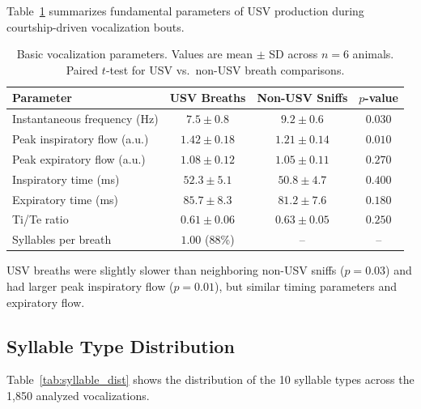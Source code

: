 \documentclass[11pt]{article}
\begin{document}
Table~\ref{tab:basic_params} summarizes fundamental parameters of USV production during courtship-driven vocalization bouts.

\begin{table}[H]
\centering
\caption{Basic vocalization parameters. Values are mean $\pm$ SD across $n = 6$ animals. Paired $t$-test for USV vs.\ non-USV breath comparisons.}
\label{tab:basic_params}
\begin{tabular}{lccc}
\toprule
Parameter & USV Breaths & Non-USV Sniffs & $p$-value \\
\midrule
Instantaneous frequency (Hz) & $7.5 \pm 0.8$ & $9.2 \pm 0.6$ & $0.030$ \\
Peak inspiratory flow (a.u.) & $1.42 \pm 0.18$ & $1.21 \pm 0.14$ & $0.010$ \\
Peak expiratory flow (a.u.) & $1.08 \pm 0.12$ & $1.05 \pm 0.11$ & $0.270$ \\
Inspiratory time (ms) & $52.3 \pm 5.1$ & $50.8 \pm 4.7$ & $0.400$ \\
Expiratory time (ms) & $85.7 \pm 8.3$ & $81.2 \pm 7.6$ & $0.180$ \\
Ti/Te ratio & $0.61 \pm 0.06$ & $0.63 \pm 0.05$ & $0.250$ \\
Syllables per breath & $1.00$ (88\%) & -- & -- \\
\bottomrule
\end{tabular}
\end{table}

USV breaths were slightly slower than neighboring non-USV sniffs ($p = 0.03$) and had larger peak inspiratory flow ($p = 0.01$), but similar timing parameters and expiratory flow.

\subsection{Syllable Type Distribution}

Table~\ref{tab:syllable_dist} shows the distribution of the 10 syllable types across the 1,850 analyzed vocalizations.
\end{document}
